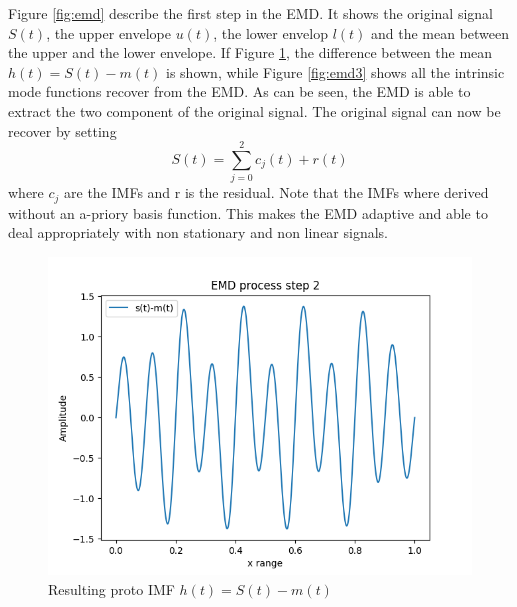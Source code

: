 \documentclass[../Main/thesis.tex]{subfiles}
\begin{document}
Figure \ref{fig:emd} describe the first step in the EMD. It shows the original signal $S(t)$, the upper envelope $u(t)$, the lower envelop $l(t)$ and the mean between the upper and the lower envelope. If Figure \ref{fig:emd2}, the difference between the mean $h(t) = S(t)-m(t)$ is shown, while Figure \ref{fig:emd3} shows all the intrinsic mode functions recover from the EMD. As can be seen, the EMD is able to extract the two component of the original signal. The original signal can now be recover by setting 
\begin{equation}\label{eq:recover1}
S(t) = \sum_{j=0}^{2} c_{j}(t) + r(t)
\end{equation}
where $c_{j}$ are the IMFs and r is the residual. Note that the IMFs where derived without an a-priory basis function. This makes the EMD adaptive and able to deal appropriately with non stationary and non linear signals.
\begin{figure}[H] %
   \centering
   \includegraphics[width=6in]{../fig/emd2.png} 
   \caption{Resulting proto IMF $h(t) = S(t)-m(t)$}
   \label{fig:emd2}
\end{figure}
\end{document}
